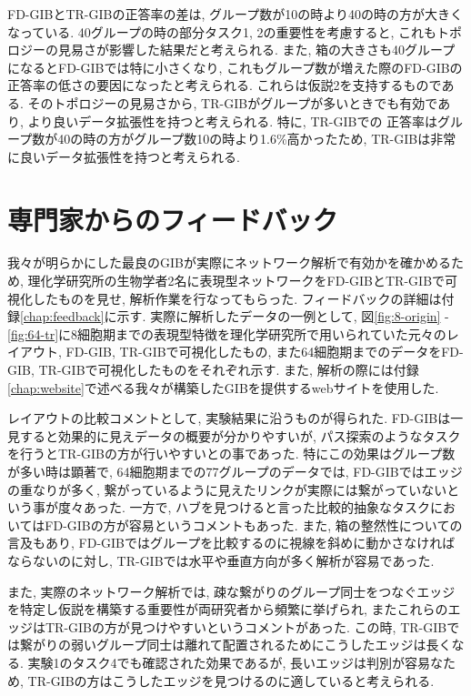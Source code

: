 \documentclass{kuee}
\begin{document}
FD-GIBとTR-GIBの正答率の差は, グループ数が10の時より40の時の方が大きくなっている.
40グループの時の部分タスク1, 2の重要性を考慮すると, これもトポロジーの見易さが影響した結果だと考えられる.
また, 箱の大きさも40グループになるとFD-GIBでは特に小さくなり, これもグループ数が増えた際のFD-GIBの正答率の低さの要因になったと考えられる.
これらは仮説2を支持するものである.
そのトポロジーの見易さから, TR-GIBがグループが多いときでも有効であり, より良いデータ拡張性を持つと考えられる.
特に, TR-GIBでの
正答率はグループ数が40の時の方がグループ数10の時より1.6\%高かったため, TR-GIBは非常に良いデータ拡張性を持つと考えられる.

\chapter{専門家からのフィードバック}
我々が明らかにした最良のGIBが実際にネットワーク解析で有効かを確かめるため, 理化学研究所の生物学者2名に表現型ネットワークをFD-GIBとTR-GIBで可視化したものを見せ, 解析作業を行なってもらった.
フィードバックの詳細は付録\ref{chap:feedback}に示す.
実際に解析したデータの一例として, 図\ref{fig:8-origin} - \ref{fig:64-tr}に8細胞期までの表現型特徴を理化学研究所で用いられていた元々のレイアウト, FD-GIB, TR-GIBで可視化したもの, また64細胞期までのデータをFD-GIB, TR-GIBで可視化したものをそれぞれ示す.
また, 解析の際には付録\ref{chap:website}で述べる我々が構築したGIBを提供するwebサイトを使用した.

レイアウトの比較コメントとして, 実験結果に沿うものが得られた.
FD-GIBは一見すると効果的に見えデータの概要が分かりやすいが, パス探索のようなタスクを行うとTR-GIBの方が行いやすいとの事であった.
特にこの効果はグループ数が多い時は顕著で, 64細胞期までの77グループのデータでは, FD-GIBではエッジの重なりが多く, 繋がっているように見えたリンクが実際には繋がっていないという事が度々あった.
一方で, ハブを見つけると言った比較的抽象なタスクにおいてはFD-GIBの方が容易というコメントもあった.
また, 箱の整然性についての言及もあり, FD-GIBではグループを比較するのに視線を斜めに動かさなければならないのに対し, TR-GIBでは水平や垂直方向が多く解析が容易であった.

また, 実際のネットワーク解析では, 疎な繋がりのグループ同士をつなぐエッジを特定し仮説を構築する重要性が両研究者から頻繁に挙げられ, またこれらのエッジはTR-GIBの方が見つけやすいというコメントがあった.
この時, TR-GIBでは繋がりの弱いグループ同士は離れて配置されるためにこうしたエッジは長くなる.
実験1のタスク4でも確認された効果であるが, 長いエッジは判別が容易なため, TR-GIBの方はこうしたエッジを見つけるのに適していると考えられる.
\end{document}
